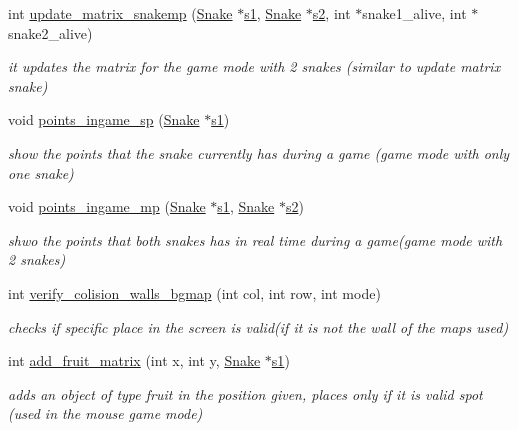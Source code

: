 \begin{DoxyCompactItemize}
int \hyperlink{group__graphics_ga114deb65eba6094fa6251e4dbf4dc1a2}{update\+\_\+matrix\+\_\+snakemp} (\hyperlink{structSnake}{Snake} $\ast$\hyperlink{group__man__events_gaf79c0d77b0cca9ebf96bbbed1f88aed0}{s1}, \hyperlink{structSnake}{Snake} $\ast$\hyperlink{group__man__events_ga5b853e8b22f27ef547e5b45e4197d308}{s2}, int $\ast$snake1\+\_\+alive, int $\ast$snake2\+\_\+alive)
\begin{DoxyCompactList}\small\item\em it updates the matrix for the game mode with 2 snakes (similar to update matrix snake) \end{DoxyCompactList}\item 
void \hyperlink{group__graphics_ga02b1006c34287574944819caa3616660}{points\+\_\+ingame\+\_\+sp} (\hyperlink{structSnake}{Snake} $\ast$\hyperlink{group__man__events_gaf79c0d77b0cca9ebf96bbbed1f88aed0}{s1})
\begin{DoxyCompactList}\small\item\em show the points that the snake currently has during a game (game mode with only one snake) \end{DoxyCompactList}\item 
void \hyperlink{group__graphics_gaf112074b9dd511b5810d96f97e003f5e}{points\+\_\+ingame\+\_\+mp} (\hyperlink{structSnake}{Snake} $\ast$\hyperlink{group__man__events_gaf79c0d77b0cca9ebf96bbbed1f88aed0}{s1}, \hyperlink{structSnake}{Snake} $\ast$\hyperlink{group__man__events_ga5b853e8b22f27ef547e5b45e4197d308}{s2})
\begin{DoxyCompactList}\small\item\em shwo the points that both snakes has in real time during a game(game mode with 2 snakes) \end{DoxyCompactList}\item 
int \hyperlink{group__graphics_ga6e759569e268b5e7abca1e056657a608}{verify\+\_\+colision\+\_\+walls\+\_\+bgmap} (int col, int row, int mode)
\begin{DoxyCompactList}\small\item\em checks if specific place in the screen is valid(if it is not the wall of the maps used) \end{DoxyCompactList}\item 
int \hyperlink{group__graphics_ga88a7bb68362e9184035973dee2da6c83}{add\+\_\+fruit\+\_\+matrix} (int x, int y, \hyperlink{structSnake}{Snake} $\ast$\hyperlink{group__man__events_gaf79c0d77b0cca9ebf96bbbed1f88aed0}{s1})
\begin{DoxyCompactList}\small\item\em adds an object of type fruit in the position given, places only if it is valid spot (used in the mouse game mode) \end{DoxyCompactList}\item 

\end{DoxyCompactItemize}
